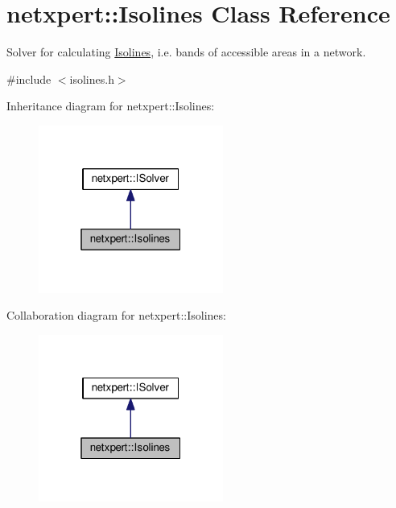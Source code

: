 \hypertarget{classnetxpert_1_1Isolines}{}\section{netxpert\+:\+:Isolines Class Reference}
\label{classnetxpert_1_1Isolines}


Solver for calculating \hyperlink{classnetxpert_1_1Isolines}{Isolines}, i.\+e. bands of accessible areas in a network.  




{\ttfamily \#include $<$isolines.\+h$>$}



Inheritance diagram for netxpert\+:\+:Isolines\+:\nopagebreak
\begin{figure}[H]
\begin{center}
\leavevmode
\includegraphics[width=172pt]{classnetxpert_1_1Isolines__inherit__graph}
\end{center}
\end{figure}


Collaboration diagram for netxpert\+:\+:Isolines\+:\nopagebreak
\begin{figure}[H]
\begin{center}
\leavevmode
\includegraphics[width=172pt]{classnetxpert_1_1Isolines__coll__graph}
\end{center}
\end{figure}
